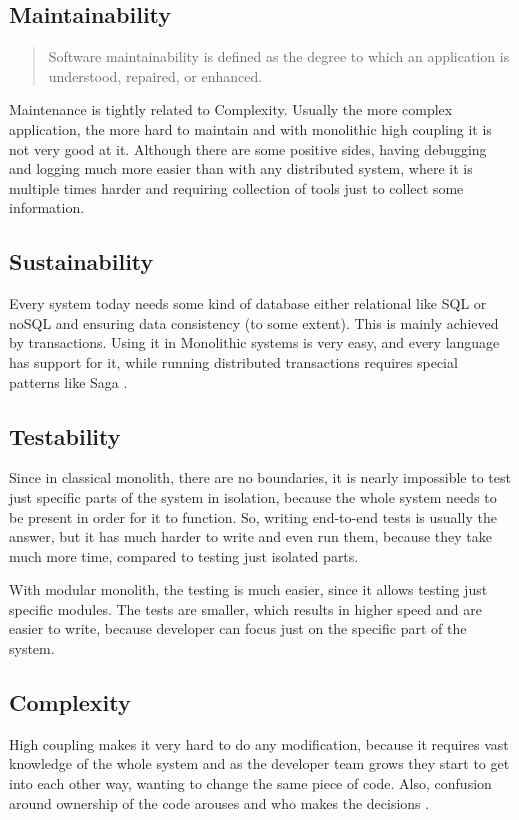 % 

\subsection{Maintainability}
\begin{quote}
    Software maintainability is defined as the degree to which an application is understood, repaired, or enhanced. \cite{SOFTWARE_MAINTAINABILITY}
\end{quote}
Maintenance is tightly related to Complexity. Usually the more complex application, the more hard to maintain and with monolithic high coupling it is not very good at it. Although there are some positive sides, having debugging and logging much more easier than with any distributed system, where it is multiple times harder and requiring collection of tools just to collect some information.



\subsection{Sustainability}
Every system today needs some kind of database either relational like SQL or noSQL and ensuring data consistency (to some extent). This is mainly achieved by transactions. Using it in Monolithic systems is very easy, and every language has support for it, while running distributed transactions requires special patterns like Saga \cite{SAGA_PATTERN}.

\subsection{Testability}
Since in classical monolith, there are no boundaries, it is nearly impossible to test just specific parts of the system in isolation, because the whole system needs to be present in order for it to function. So, writing end-to-end tests is usually the answer, but it has much harder to write and even run them, because they take much more time, compared to testing just isolated parts.

With modular monolith, the testing is much easier, since it allows testing just specific modules. The tests are smaller, which results in higher speed and are easier to write, because developer can focus just on the specific part of the system.

\subsection{Complexity}
High coupling makes it very hard to do any modification, because it requires vast knowledge of the whole system and as the developer team grows they start to get into each other way, wanting to change the same piece of code. Also, confusion around ownership of the code arouses and who makes the decisions \cite{MON_TO_MS_MONOLITH}.

